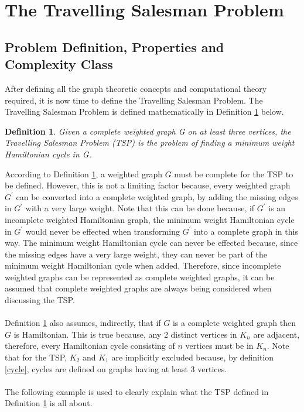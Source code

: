 \documentclass{article}
\newtheorem{definition}{Definition}[subsection]
\begin{document}
\section{The Travelling Salesman Problem}
\subsection{Problem Definition, Properties and Complexity Class}
After defining all the graph theoretic concepts and computational theory required, it is now time to define the Travelling Salesman Problem. The Travelling Salesman Problem is defined mathematically in Definition \ref{TSP} below.
\begin{definition}
\label{TSP}
Given a complete weighted graph G on at least three vertices, the Travelling Salesman Problem (TSP) is the problem of finding a minimum weight Hamiltonian cycle in G. {}
\end{definition}
According to Definition \ref{TSP}, a weighted graph $\mathit{G}$ must be complete for the TSP to be defined. However, this is not a limiting factor because, every weighted graph $\mathit{G^\prime}$ can be converted into a complete weighted graph, by adding the missing edges in $\mathit{G^\prime}$ with a very large weight. Note that this can be done because, if $\mathit{G^\prime}$ is an incomplete weighted Hamiltonian graph, the minimum weight Hamiltonian cycle in $\mathit{G^\prime}$ would never be effected when transforming $\mathit{G^\prime}$ into a complete graph in this way. The minimum weight Hamiltonian cycle can never be effected because, since the missing edges have a very large weight, they can never be part of the minimum weight Hamiltonian cycle when added. Therefore, since incomplete weighted graphs can be represented as complete weighted graphs, it can be assumed that complete weighted graphs are always being considered when discussing the TSP.\\\\
Definition \ref{TSP} also assumes, indirectly, that if $\mathit{G}$ is a complete weighted graph then $\mathit{G}$ is Hamiltonian. This is true because, any 2 distinct vertices in $K_n$ are adjacent, therefore, every Hamiltonian cycle consisting of $n$ vertices must be in $K_n$. Note that for the TSP, $K_2$ and $K_1$ are implicitly excluded because, by definition \ref{cycle}, cycles are defined on graphs having at least 3 vertices.\\ 
\\
The following example is used to clearly explain what the TSP defined in Definition \ref{TSP} is all about.
\end{document}
